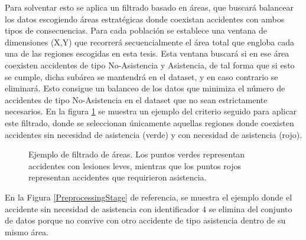 \documentclass{uathesis-es}
\begin{document}
{	Para solventar esto se aplica un filtrado basado en áreas, que buscará balancear los datos escogiendo áreas estratégicas donde coexistan accidentes con ambos tipos de consecuencias. Para cada población se establece una ventana de dimensiones (X,Y) que recorrerá secuencialmente el área total que engloba cada una de las regiones escogidas en esta tesis. Esta ventana buscará si en ese área coexisten accidentes de tipo No-Asistencia y Asistencia, de tal forma que si esto se cumple, dicha subárea se mantendrá en el dataset, y en caso contrario se eliminará. Esto consigue un balanceo de los datos que minimiza el número de accidentes de tipo No-Asistencia en el dataset que no sean estrictamente necesarios. En la figura \ref{Areas} se muestra un ejemplo del criterio seguido para aplicar este filtrado, donde se seleccionan únicamente aquellas regiones donde coexisten accidentes sin necesidad de asistencia (verde) y con necesidad de asistencia (rojo).
	
	\begin{figure}[H]
		\centering    
		
		\label{Areas}
		\caption{Ejemplo de filtrado de áreas. Los puntos verdes representan accidentes con lesiones leves, mientras que los puntos rojos representan accidentes que requirieron asistencia.}
	\end{figure}
	
	En la Figura \ref{PreprocessingStage} de referencia, se muestra el ejemplo donde el accidente sin necesidad de asistencia con identificador 4 se elimina del conjunto de datos porque no convive con otro accidente de tipo asistencia dentro de su mismo área.
	
}
\end{document}

